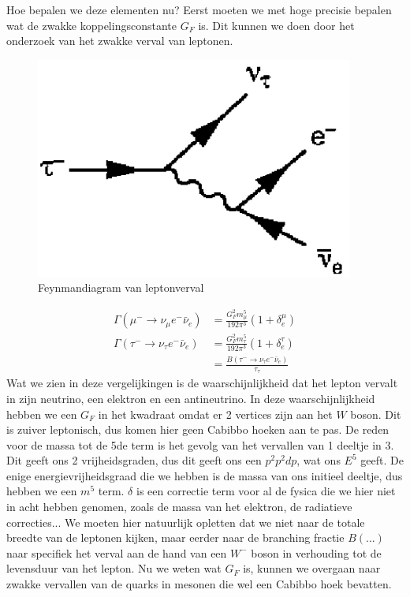 \documentclass[../main.tex]{subfiles}
\begin{document}
Hoe bepalen we deze elementen nu? Eerst moeten we met hoge precisie bepalen wat de zwakke koppelingsconstante $G_F$ is. Dit kunnen we doen door het onderzoek van het zwakke verval van leptonen.

\begin{figure}[h]
    \centering
    \includegraphics[width=0.5\linewidth]{meson_mixing_and_oscillations/zwak_lep_verval.png}
    \caption{Feynmandiagram van leptonverval}%
    \label{fig:meson_mixing_and_oscillations/zwak_lep_verval}
\end{figure}

\begin{equation}
    \begin{aligned}
        \label{eq:lep_verval_zwak}
        \Gamma\left(\mu^{-} \rightarrow \nu_{\mu} e^{-} \bar{\nu}_{e}\right) &=\frac{G_{F}^{2} m_{\mu}^{5}}{192 \pi^{3}}\left(1+\delta_{e}^{\mu}\right) \\
        \Gamma\left(\tau^{-} \rightarrow \nu_{\tau} e^{-} \bar{\nu}_{e}\right) &=\frac{G_{F}^{2} m_{\tau}^{5}}{192 \pi^{3}}\left(1+\delta_{e}^{\tau}\right) \\
                                                                               &=\frac{B\left(\tau^{-} \rightarrow \nu_{\tau} e^{-} \bar{\nu}_{e}\right)}{\tau_{\tau}}
    \end{aligned}
\end{equation}
Wat we zien in deze vergelijkingen is de waarschijnlijkheid dat het lepton vervalt in zijn neutrino, een elektron en een antineutrino. In deze waarschijnlijkheid hebben we een $G_F$ in het kwadraat omdat er 2 vertices zijn aan het $W$ boson. Dit is zuiver leptonisch, dus komen hier geen Cabibbo hoeken aan te pas. De reden voor de massa tot de 5de term is het gevolg van het vervallen van 1 deeltje in 3. Dit geeft ons 2 vrijheidsgraden, dus dit geeft ons een $p^2p^2dp$, wat ons $E^5$ geeft. De enige energievrijheidsgraad die we hebben is de massa van ons initieel deeltje, dus hebben we een $m^5$ term. $\delta$ is een correctie term voor al de fysica die we hier niet in acht hebben genomen, zoals de massa van het elektron, de radiatieve correcties... We moeten hier natuurlijk opletten dat we niet naar de totale breedte van de leptonen kijken, maar eerder naar de branching fractie $B(...)$ naar specifiek het verval aan de hand van een $W^-$ boson in verhouding tot de levensduur van het lepton. Nu we weten wat $G_F$ is, kunnen we overgaan naar zwakke vervallen van de quarks in mesonen die wel een Cabibbo hoek bevatten.
\end{document}
